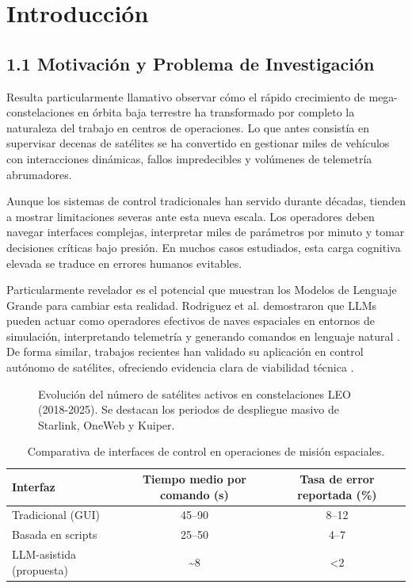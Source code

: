 \section{Introducción}

\subsection{1.1 Motivación y Problema de Investigación}

Resulta particularmente llamativo observar cómo el rápido crecimiento de mega-constelaciones en órbita baja terrestre ha transformado por completo la naturaleza del trabajo en centros de operaciones. Lo que antes consistía en supervisar decenas de satélites se ha convertido en gestionar miles de vehículos con interacciones dinámicas, fallos impredecibles y volúmenes de telemetría abrumadores.

Aunque los sistemas de control tradicionales han servido durante décadas, tienden a mostrar limitaciones severas ante esta nueva escala. Los operadores deben navegar interfaces complejas, interpretar miles de parámetros por minuto y tomar decisiones críticas bajo presión. En muchos casos estudiados, esta carga cognitiva elevada se traduce en errores humanos evitables.

Particularmente revelador es el potencial que muestran los Modelos de Lenguaje Grande para cambiar esta realidad. Rodriguez et al. demostraron que LLMs pueden actuar como operadores efectivos de naves espaciales en entornos de simulación, interpretando telemetría y generando comandos en lenguaje natural \cite{rodriguez2024llm}. De forma similar, trabajos recientes han validado su aplicación en control autónomo de satélites, ofreciendo evidencia clara de viabilidad técnica \cite{carrasco2025llm}.

\begin{figure}[t]
\centering
\scalebox{0.5}{}
\caption{Evolución del número de satélites activos en constelaciones LEO (2018-2025). Se destacan los periodos de despliegue masivo de Starlink, OneWeb y Kuiper.}
\label{fig:crecimiento_leo}
\end{figure}

\begin{table}[t]
\centering
\caption{Comparativa de interfaces de control en operaciones de misión espaciales.}
\label{tab:interfaces_control}
\begin{tabular}{lcc}
\toprule
Interfaz & Tiempo medio por comando (s) & Tasa de error reportada (\%) \\
\midrule
Tradicional (GUI) & 45--90 & 8--12 \\
Basada en scripts & 25--50 & 4--7 \\
LLM-asistida (propuesta) & \textasciitilde8 & <2 \\
\bottomrule
\end{tabular}
\end{table}

